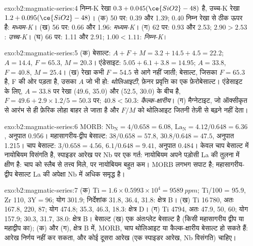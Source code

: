 \begin{solution}{exo:b2:magmatic-series:4}
निम्न-K रेखा $0.3 + 0.045(\ce{SiO2} - 48)$ है, उच्च-K रेखा $1.2 +
0.095(\ce{SiO2} - 48)$। (क) 50 पर: 0.39 और 1.39; $0.40$ निम्न रेखा से ठीक ऊपर है:
\emph{मध्यम-K}। (ख) 56 पर: 0.66 और 1.96: \emph{मध्यम-K}। (ग) 62 पर: 0.93 और 2.53;
$2.90 > 2.53$: \emph{उच्च-K}। (घ) 66 पर: 1.11 और 2.91; $1.00 < 1.11$: \emph{निम्न-K}।
\end{solution}

\begin{solution}{exo:b2:magmatic-series:5}
(क) बेसाल्ट: $A + F + M = 3.2 + 14.5 + 4.5 = 22.2$; $A = 14.4$, $F = 65.3$, $M = 20.3$।
एंडेसाइट: $5.05 + 6.1 + 3.8 = 14.95$; $A = 33.8$, $F = 40.8$, $M = 25.4$। (ख) रेखा
कभी $F = 54.5$ से आगे नहीं जाती; बेसाल्ट, जिसका $F = 65.3$ है, F की ओर पड़ता है,
उसका $A$ जो भी हो: \emph{थोलिआइटी}, फ़ेनर प्रवृत्ति का एक फ़ेरोबेसाल्ट। एंडेसाइट के
लिए, $A = 33.8$ पर रेखा (49.6, 35.0) और (52.5, 30.0) के बीच है, $F =
49.6 + 2.9\times1.2/5 = 50.3$ पर; $40.8 < 50.3$: \emph{कैल्क-क्षारीय}। (ग) मैग्नेटाइट,
जो ऑक्सीकृत  से आरंभ से ही फ़ेरिक लोहा बाहर ले जाता है और $F/M$ को
थोलिआइट जितनी तेज़ी से बढ़ने नहीं देता।
\end{solution}

\begin{solution}{exo:b2:magmatic-series:6}
MORB: $\mathrm{Nb_N} = 4/0.658 = 6.08$, $\mathrm{La_N} = 4.12/0.648 = 6.36$, अनुपात
0.956। महासागरीय-द्वीप बेसाल्ट: $38/0.658 = 57.8$, $30.8/0.648 = 47.5$, अनुपात 1.215। चाप
बेसाल्ट: $3/0.658 = 4.56$, $6.1/0.648 = 9.41$, अनुपात 0.484। केवल चाप बेसाल्ट में
नायोबियम विसंगति है, स्पाइडर आरेख पर Nb पर एक गर्त: नायोबियम अपने
पड़ोसी La की तुलना में क्षीण है: चाप  को स्लैब से तत्त्व मिले, पर नायोबियम
बहुत कम। MORB लगभग सपाट है; महासागरीय-द्वीप बेसाल्ट La की अपेक्षा
Nb में अधिक समृद्ध है।
\end{solution}

\begin{solution}{exo:b2:magmatic-series:7}
(क) $\mathrm{Ti} = 1.6\times0.5993\times10^4 = \qty{9589}{ppm}$; Ti/100 = 95.9, Zr
110, $3\mathrm Y = 96$; योग 301.9; निर्देशांक 31.8, 36.4, 31.8: क्षेत्र B। (ख) Ti
16\,780, अतः 167.8, 220, 87; योग 474.8; 35.3, 46.3, 18.3: क्षेत्र D। (ग) Ti 4794, अतः
47.9, 50, 60; योग 157.9; 30.3, 31.7, 38.0: क्षेत्र B। बेसाल्ट (ख) एक अंतःप्लेट बेसाल्ट है
(किसी महासागरीय द्वीप या महाद्वीप का); (क) और (ग), क्षेत्र B में, MORB, चाप
थोलिआइट या कैल्क-क्षारीय बेसाल्ट हो सकते हैं: आरेख निर्णय नहीं कर सकता, और कोई दूसरा आरेख (एक
स्पाइडर आरेख, Nb विसंगति) चाहिए।
\end{solution}


